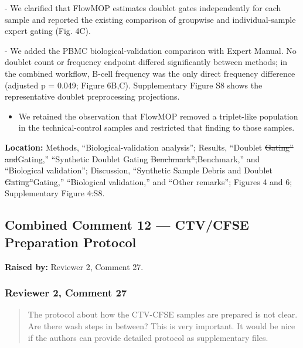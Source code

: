 \documentclass[
  11pt,
  a4paper,
]{article}
\providecommand{\tightlist}{%
  \setlength{\itemsep}{0pt}\setlength{\parskip}{0pt}}
\begin{document}
{\color{revisionblue}- We clarified that FlowMOP estimates doublet gates
independently for each sample and reported the existing comparison of
groupwise and individual-sample expert gating (Fig. 4C).}

{\color{revisionblue}- We added the PBMC biological-validation
comparison with Expert Manual. No doublet count or frequency endpoint
differed significantly between methods; in the combined workflow, B-cell
frequency was the only direct frequency difference (adjusted p = 0.049;
Figure 6B,C). Supplementary Figure S8 shows the representative doublet
preprocessing projections.}

\begin{itemize}
\tightlist
\item
  We retained the observation that FlowMOP removed a triplet-like
  population in the technical-control samples and restricted that
  finding to those samples.
\end{itemize}

\textbf{Location:} {\color{revisionblue}Methods, ``Biological-validation
analysis'';} Results, ``Doublet {\color{revisionred}\sout{Gating''
and}}{\color{revisionblue}Gating,''} ``Synthetic Doublet Gating
{\color{revisionred}\sout{Benchmark'';}}{\color{revisionblue}Benchmark,''
and ``Biological validation'';} Discussion, ``Synthetic Sample Debris
and Doublet
{\color{revisionred}\sout{Gating''}}{\color{revisionblue}Gating,''
``Biological validation,''} and ``Other remarks'';
{\color{revisionblue}Figures 4 and 6; Supplementary} Figure
{\color{revisionred}\sout{4.}}{\color{revisionblue}S8.}

\subsection{Combined Comment 12 --- CTV/CFSE Preparation
Protocol}\label{combined-comment-12--ctvcfse-preparation-protocol}

\textbf{Raised by:} Reviewer 2, Comment 27.

\subsubsection{Reviewer 2, Comment 27}\label{reviewer-2-comment-27}

\begin{quote}
The protocol about how the CTV-CFSE samples are prepared is not clear.
Are there wash steps in between? This is very important. It would be
nice if the authors can provide detailed protocol as supplementary
files.
\end{quote}
\end{document}
